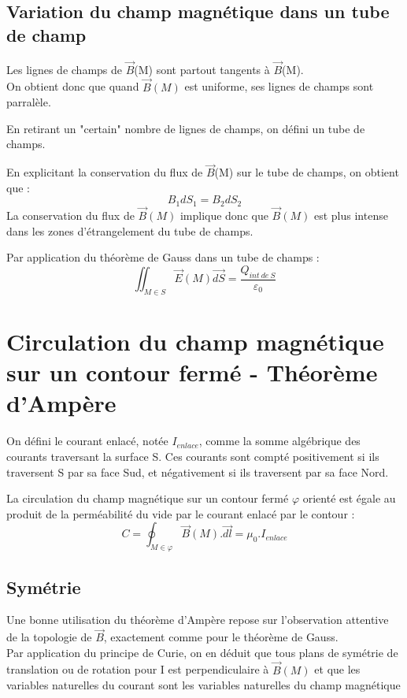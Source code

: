 \subsection{Variation du champ magnétique dans un tube de champ}
Les lignes de champs de $\overrightarrow{B}$(M) sont partout tangents à $\overrightarrow{B}$(M).\\
On obtient donc que quand $\overrightarrow{B}(M)$ est uniforme, ses lignes de champs sont parralèle.
\begin{de}
En retirant un "certain" nombre de lignes de champs, on défini un tube de champs.
\end{de}
\begin{prop}
En explicitant la conservation du flux de $\overrightarrow{B}$(M) sur le tube de champs, on obtient que : 
$$B_1dS_1 = B_2dS_2$$
La conservation du flux de $\overrightarrow{B}(M)$ implique donc que $\overrightarrow{B}(M)$ est plus intense dans les zones d'étrangelement du tube de champs.
\end{prop}
\begin{prop}
Par application du théorème de Gauss dans un tube de champs : 
$$\iint_{M \in S} \overrightarrow{E}(M)\overrightarrow{dS} = \dfrac{Q_{int~ de~ S}}{\varepsilon_0}$$
\end{prop}
\section{Circulation du champ magnétique sur un contour fermé - Théorème d'Ampère}
\begin{de}
On défini le courant enlacé, notée $I_{enlace}$, comme la somme algébrique des courants traversant la surface S. Ces courants sont compté positivement si ils traversent S par sa face Sud, et négativement si ils traversent par sa face Nord.
\end{de}

\begin{enon}
La circulation du champ magnétique sur un contour fermé $\varphi$ orienté est égale au produit de la perméabilité du vide par le courant enlacé par le contour :
$$C = \oint_{M \in \varphi}\overrightarrow{B}(M).\overrightarrow{dl} = \mu_0.I_{enlace}$$
\end{enon}
\subsection{Symétrie}
\begin{prop}
Une bonne utilisation du théorème d'Ampère repose sur l'observation attentive de la topologie de $\overrightarrow{B}$, exactement comme pour le théorème de Gauss.\\
Par application du principe de Curie, on en déduit que tous plans de symétrie de translation ou de rotation pour I est perpendiculaire à $\overrightarrow{B}(M)$ et que les variables naturelles du courant sont les variables naturelles du champ magnétique 
\end{prop}


